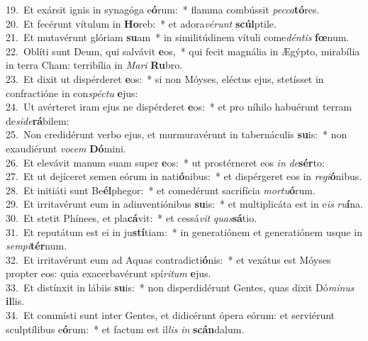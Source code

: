 {19.~}Et exársit ignis in synagóga e\textbf{ó}rum:~* flamma combússit \textit{pec}\textit{ca}\textbf{tó}res.\\
{20.~}Et fecérunt vítulum in \textbf{Ho}reb:~* et adora\textit{vé}\textit{runt} \textbf{scúl}ptile.\\
{21.~}Et mutavérunt glóriam \textbf{su}am~* in similitúdinem vítuli come\textit{dén}\textit{tis} \textbf{fœ}num.\\
{22.~}Oblíti sunt Deum, qui salvávit \textbf{e}os,~* qui fecit magnália in Ægýpto, mirabília in terra Cham: terribília in \textit{Ma}\textit{ri} \textbf{Ru}bro.\\
{23.~}Et dixit ut dispérderet \textbf{e}os:~* si non Móyses, eléctus ejus, stetísset in confractióne in con\textit{spé}\textit{ctu} \textbf{e}jus:\\
{24.~}Ut avérteret iram ejus ne dispérderet \textbf{e}os:~* et pro níhilo habuérunt terram de\textit{si}\textit{de}\textbf{rá}bilem:\\
{25.~}Non credidérunt verbo ejus, et murmuravérunt in tabernáculis \textbf{su}is:~* non exaudiérunt \textit{vo}\textit{cem} \textbf{Dó}mini.\\
{26.~}Et elevávit manum suam super \textbf{e}os:~* ut prostérneret eos \textit{in} \textit{de}\textbf{sér}to:\\
{27.~}Et ut dejíceret semen eórum in nati\textbf{ó}nibus:~* et dispérgeret eos in \textit{re}\textit{gi}\textbf{ó}nibus.\\
{28.~}Et initiáti sunt Be\textbf{él}phegor:~* et comedérunt sacrifícia \textit{mor}\textit{tu}\textbf{ó}rum.\\
{29.~}Et irritavérunt eum in adinventiónibus \textbf{su}is:~* et multiplicáta est in e\textit{is} \textit{ru}\textbf{í}na.\\
{30.~}Et stetit Phínees, et pla\textbf{cá}vit:~* et cessá\textit{vit} \textit{quas}\textbf{sá}tio.\\
{31.~}Et reputátum est ei in ju\textbf{stí}tiam:~* in generatiónem et generatiónem usque in \textit{sem}\textit{pi}\textbf{tér}num.\\
{32.~}Et irritavérunt eum ad Aquas contradicti\textbf{ó}nis:~* et vexátus est Móyses propter eos: quia exacerbavérunt spí\textit{ri}\textit{tum} \textbf{e}jus.\\
{33.~}Et distínxit in lábiis \textbf{su}is:~* non disperdidérunt Gentes, quas dixit Dó\textit{mi}\textit{nus} \textbf{il}lis.\\
{34.~}Et commísti sunt inter Gentes, et didicérunt ópera eórum: et serviérunt sculptílibus e\textbf{ó}rum:~* et factum est il\textit{lis} \textit{in} \textbf{scán}dalum.\\
